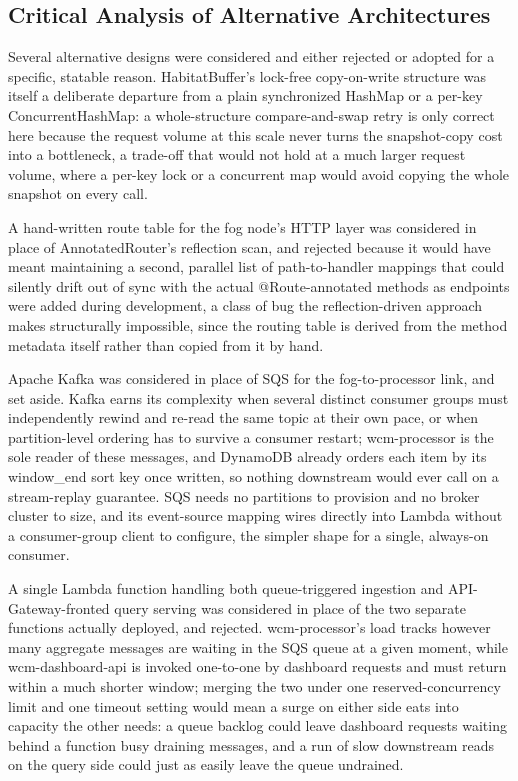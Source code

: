 \documentclass[conference,a4paper]{IEEEtran}
\begin{document}
\subsection{Critical Analysis of Alternative Architectures}

Several alternative designs were considered and either rejected or adopted for a specific, statable reason. HabitatBuffer's lock-free copy-on-write structure was itself a deliberate departure from a plain synchronized HashMap or a per-key ConcurrentHashMap: a whole-structure compare-and-swap retry is only correct here because the request volume at this scale never turns the snapshot-copy cost into a bottleneck, a trade-off that would not hold at a much larger request volume, where a per-key lock or a concurrent map would avoid copying the whole snapshot on every call.

A hand-written route table for the fog node's HTTP layer was considered in place of AnnotatedRouter's reflection scan, and rejected because it would have meant maintaining a second, parallel list of path-to-handler mappings that could silently drift out of sync with the actual @Route-annotated methods as endpoints were added during development, a class of bug the reflection-driven approach makes structurally impossible, since the routing table is derived from the method metadata itself rather than copied from it by hand.

Apache Kafka was considered in place of SQS for the fog-to-processor link, and set aside. Kafka earns its complexity when several distinct consumer groups must independently rewind and re-read the same topic at their own pace, or when partition-level ordering has to survive a consumer restart; wcm-processor is the sole reader of these messages, and DynamoDB already orders each item by its window\_end sort key once written, so nothing downstream would ever call on a stream-replay guarantee. SQS needs no partitions to provision and no broker cluster to size, and its event-source mapping wires directly into Lambda without a consumer-group client to configure, the simpler shape for a single, always-on consumer.

A single Lambda function handling both queue-triggered ingestion and API-Gateway-fronted query serving was considered in place of the two separate functions actually deployed, and rejected. wcm-processor's load tracks however many aggregate messages are waiting in the SQS queue at a given moment, while wcm-dashboard-api is invoked one-to-one by dashboard requests and must return within a much shorter window; merging the two under one reserved-concurrency limit and one timeout setting would mean a surge on either side eats into capacity the other needs: a queue backlog could leave dashboard requests waiting behind a function busy draining messages, and a run of slow downstream reads on the query side could just as easily leave the queue undrained.
\end{document}
